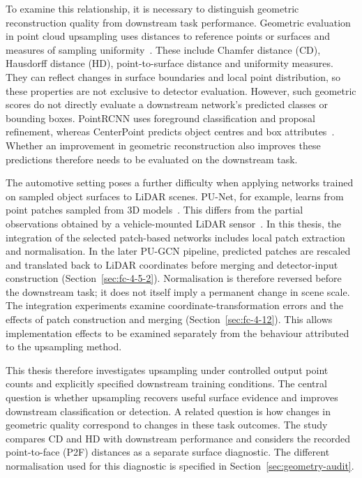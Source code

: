 To examine this relationship, it is necessary to distinguish geometric
reconstruction quality from downstream task performance. Geometric
evaluation in point cloud upsampling uses distances to reference points or
surfaces and measures of sampling uniformity~\cite{yu2018punet,qian2021pugcn}.
These include Chamfer distance (CD), Hausdorff distance (HD),
point-to-surface distance and uniformity measures. They can reflect changes
in surface boundaries and local point distribution, so these properties
are not exclusive to detector evaluation. However, such geometric scores
do not directly evaluate a downstream network's predicted classes or
bounding boxes. PointRCNN uses foreground classification and proposal
refinement, whereas CenterPoint predicts object centres and box
attributes~\cite{shi2019pointrcnn,yin2021centerpoint}. Whether an
improvement in geometric reconstruction also improves these predictions
therefore needs to be evaluated on the downstream task.

The automotive setting poses a further difficulty when applying networks
trained on sampled object surfaces to \ac{LiDAR} scenes. PU-Net, for
example, learns from point patches sampled from 3D
models~\cite{yu2018punet}. This differs from the partial observations
obtained by a vehicle-mounted \ac{LiDAR}
sensor~\cite{geiger2012kitti,geiger2013kitti}. In this thesis, the
integration of the selected patch-based networks includes local patch
extraction and normalisation. In the later PU-GCN pipeline, predicted
patches are rescaled and translated back to \ac{LiDAR} coordinates before
merging and detector-input construction
(Section~\ref{sec:fc-4-5-2}). Normalisation is therefore reversed before
the downstream task; it does not itself imply a permanent change in scene
scale. The integration experiments examine coordinate-transformation
errors and the effects of patch construction and merging
(Section~\ref{sec:fc-4-12}). This allows implementation effects to be
examined separately from the behaviour attributed to the upsampling method.

This thesis therefore investigates upsampling under controlled output
point counts and explicitly specified downstream training conditions.
The central question is whether upsampling recovers useful surface
evidence and improves downstream classification or detection. A related
question is how changes in geometric quality correspond to changes in
these task outcomes. The study compares CD and HD with downstream
performance and considers the recorded point-to-face (P2F) distances as a
separate surface diagnostic. The different normalisation used for this
diagnostic is specified in Section~\ref{sec:geometry-audit}.

